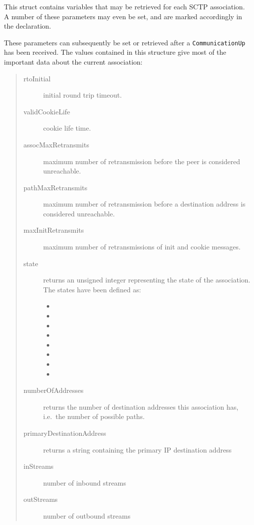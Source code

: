 \documentclass[10pt]{article}
\newcommand{\no}{ }
\begin{document}
\subsubsection{}
\label{association-status}
This struct contains variables that may be retrieved for each
 SCTP association.
A number of these parameters may even be set, and are marked accordingly in
the declaration.

These parameters can
subsequently be set or retrieved after a \texttt{CommunicationUp}
has been received.
The values contained in this structure give most of the important
data about the current association:
\begin{quote} \begin{description} \no
\item[rtoInitial]  initial round trip timeout.
\item[validCookieLife]  cookie life time.
\item[assocMaxRetransmits]
 maximum number of retransmission before the peer is considered unreachable.
\item[pathMaxRetransmits]
maximum number of retransmission before a destination address is considered unreachable.
\item[maxInitRetransmits]
maximum number of retransmissions of init and cookie messages.
\item[state]
returns an unsigned integer representing the state of
the association. The states have been defined as:
\begin{itemize}
\item {}
\item {}
\item {}
\item {}
\item {}
\item {}
\item {}
\item {}
\end{itemize}
\item[numberOfAddresses]
returns the number of destination addresses this
association has, i.e.\ the number of possible paths.
\item[primaryDestinationAddress]
returns a string containing the primary IP destination address
\item[inStreams] number of inbound streams
\item[outStreams] number of outbound streams
\end{description} \end{quote}
\end{document}
